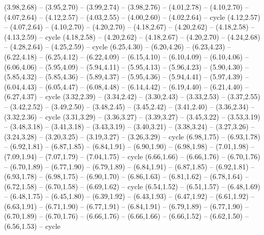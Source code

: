 \expandafter\def\csname geo:gebiet:GUY\endcsname{
  (3.98,2.68) -- (3.95,2.70) -- (3.99,2.74) -- (3.98,2.76) -- (4.01,2.78) -- (4.10,2.70) -- (4.07,2.64) -- (4.12,2.57) -- (4.03,2.55) -- (4.00,2.60) -- (4.02,2.64) -- cycle}
\expandafter\def\csname geo:gebiet:SUR\endcsname{
  (4.12,2.57) -- (4.07,2.64) -- (4.10,2.70) -- (4.20,2.70) -- (4.18,2.67) -- (4.20,2.62) -- (4.18,2.58) -- (4.13,2.59) -- cycle}
\expandafter\def\csname geo:gebiet:FRA\endcsname{
  (4.18,2.58) -- (4.20,2.62) -- (4.18,2.67) -- (4.20,2.70) -- (4.24,2.68) -- (4.28,2.64) -- (4.25,2.59) -- cycle
  (6.25,4.30) -- (6.20,4.26) -- (6.23,4.23) -- (6.22,4.18) -- (6.25,4.12) -- (6.22,4.09) -- (6.15,4.10) -- (6.10,4.09) -- (6.10,4.06) -- (6.06,4.06) -- (5.95,4.09) -- (5.94,4.11) -- (5.95,4.13) -- (5.96,4.23) -- (5.90,4.30) -- (5.85,4.32) -- (5.85,4.36) -- (5.89,4.37) -- (5.95,4.36) -- (5.94,4.41) -- (5.97,4.39) -- (6.04,4.43) -- (6.05,4.47) -- (6.08,4.48) -- (6.14,4.42) -- (6.19,4.40) -- (6.21,4.40) -- (6.27,4.37) -- cycle}
\expandafter\def\csname geo:gebiet:ECU\endcsname{
  (3.32,2.39) -- (3.34,2.42) -- (3.30,2.43) -- (3.33,2.53) -- (3.37,2.55) -- (3.42,2.52) -- (3.49,2.50) -- (3.48,2.45) -- (3.45,2.42) -- (3.41,2.40) -- (3.36,2.34) -- (3.32,2.36) -- cycle}
\expandafter\def\csname geo:gebiet:PRI\endcsname{
  }
\expandafter\def\csname geo:gebiet:JAM\endcsname{
  }
\expandafter\def\csname geo:gebiet:CUB\endcsname{
  (3.31,3.29) -- (3.36,3.27) -- (3.39,3.27) -- (3.45,3.22) -- (3.53,3.19) -- (3.48,3.18) -- (3.41,3.18) -- (3.43,3.19) -- (3.40,3.21) -- (3.38,3.24) -- (3.27,3.26) -- (3.24,3.28) -- (3.20,3.25) -- (3.19,3.27) -- (3.26,3.29) -- cycle}
\expandafter\def\csname geo:gebiet:ZWE\endcsname{
  (6.98,1.75) -- (6.93,1.78) -- (6.92,1.81) -- (6.87,1.85) -- (6.84,1.91) -- (6.90,1.90) -- (6.98,1.98) -- (7.01,1.98) -- (7.09,1.94) -- (7.07,1.79) -- (7.04,1.75) -- cycle}
\expandafter\def\csname geo:gebiet:BWA\endcsname{
  (6.66,1.66) -- (6.66,1.76) -- (6.70,1.76) -- (6.70,1.89) -- (6.77,1.90) -- (6.79,1.89) -- (6.84,1.91) -- (6.87,1.85) -- (6.92,1.81) -- (6.93,1.78) -- (6.98,1.75) -- (6.90,1.70) -- (6.86,1.63) -- (6.81,1.62) -- (6.78,1.64) -- (6.72,1.58) -- (6.70,1.58) -- (6.69,1.62) -- cycle}
\expandafter\def\csname geo:gebiet:NAM\endcsname{
  (6.54,1.52) -- (6.51,1.57) -- (6.48,1.69) -- (6.48,1.75) -- (6.45,1.80) -- (6.39,1.92) -- (6.43,1.93) -- (6.47,1.92) -- (6.61,1.92) -- (6.63,1.91) -- (6.71,1.90) -- (6.77,1.91) -- (6.84,1.91) -- (6.79,1.89) -- (6.77,1.90) -- (6.70,1.89) -- (6.70,1.76) -- (6.66,1.76) -- (6.66,1.66) -- (6.66,1.52) -- (6.62,1.50) -- (6.56,1.53) -- cycle}
